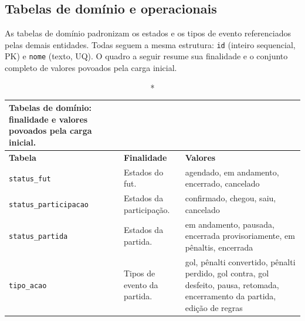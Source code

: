 \begin{apendicesenv}
    \section*{Tabelas de domínio e operacionais}

    As tabelas de domínio padronizam os estados e os tipos de evento referenciados pelas demais entidades. Todas seguem a mesma estrutura: \texttt{id} (inteiro sequencial, PK) e \texttt{nome} (texto, UQ). O quadro a seguir resume sua finalidade e o conjunto completo de valores povoados pela carga inicial.

    \begin{longtable}{p{3.2cm}p{5.4cm}p{5.1cm}}
    \caption*{Tabelas de domínio: finalidade e valores povoados pela carga inicial.}\\
        \hline
        \textbf{Tabela} & \textbf{Finalidade} & \textbf{Valores} \\
        \hline
        \endhead
        \texttt{status\_fut} & Estados do fut. & agendado, em andamento, encerrado, cancelado \\
        \texttt{status\_participacao} & Estados da participação. & confirmado, chegou, saiu, cancelado \\
        \texttt{status\_partida} & Estados da partida. & em andamento, pausada, encerrada provisoriamente, em pênaltis, encerrada \\
        \texttt{tipo\_acao} & Tipos de evento da partida. & gol, pênalti convertido, pênalti perdido, gol contra, gol desfeito, pausa, retomada, encerramento da partida, edição de regras \\
        \hline
    \end{longtable}


\end{apendicesenv}
